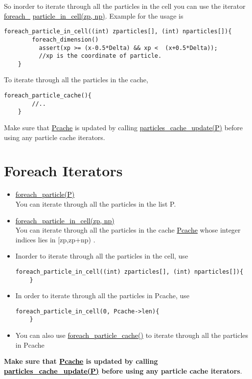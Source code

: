 \documentclass[a4paper,12pt]{article}
\newcommand{\fname}[1]{\textcolor{black}{\underline{#1}}}
\begin{document}
    So inorder to iterate through all the particles in  the cell you can use the iterator
    \fname{foreach\_} \fname{particle\_in\_cell(zp, np)}. Example for the usage is
    \begin{lstlisting}[style=CStyle]
    foreach_particle_in_cell((int) zparticles[], (int) nparticles[]){
        foreach_dimension()
          assert(xp >= (x-0.5*Delta) && xp <  (x+0.5*Delta));
          //xp is the coordinate of particle.
    }
    \end{lstlisting}
    
    To iterate through all the particles in the cache, 
    \begin{lstlisting}[style=CStyle]
    foreach_particle_cache(){
        //..
    }
    \end{lstlisting}
    Make sure that \fname{Pcache} is updated by calling  \fname{particles\_cache\_update(P)} before using any particle cache iterators.
    
    \section{Foreach Iterators}
    \begin{itemize}
        \item \fname{foreach\_particle(P)} \\
        You can iterate through all the particles in the list P.
        \item \fname{foreach\_particle\_in\_cell(zp, np)} \\
        You can iterate through all the particles in the cache \fname{Pcache} whose integer indices lies in [zp,zp+np) .
        \item Inorder to iterate through all the particles in the cell, use
        \begin{lstlisting}[style=CStyle]
    foreach_particle_in_cell((int) zparticles[], (int) nparticles[]){
    }   \end{lstlisting}
        \item In order to iterate through all the particles in Pcache, use    \begin{lstlisting}[style=CStyle]
    foreach_particle_in_cell(0, Pcache->len){
    }    \end{lstlisting}
        \item You can also use \fname{foreach\_particle\_cache()} to iterate through all the particles in Pcache
    \end{itemize}
    \textbf{Make sure that \fname{Pcache} is updated by calling  \fname{particles\_cache\_update(P)} before using any particle cache iterators}.
    
\end{document}
